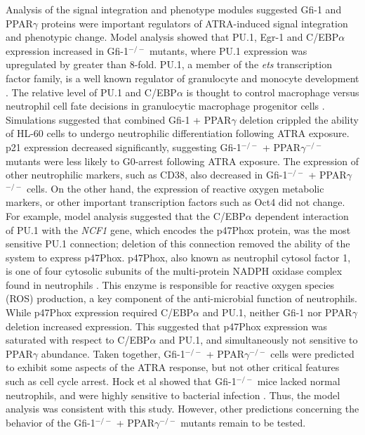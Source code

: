 \documentclass[12pt]{article}
\begin{document}
%
Analysis of the signal integration and phenotype modules suggested Gfi-1 and PPAR$\gamma$ proteins were important regulators of ATRA-induced signal integration and phenotypic change.
Model analysis showed that PU.1, Egr-1 and C/EBP$\alpha$ expression increased in Gfi-1$^{-/-}$ mutants, where PU.1 expression was upregulated by greater than 8-fold.
PU.1, a member of the \textit{ets} transcription factor family, is a well known regulator of granulocyte and monocyte development \cite{Friedman2007}.
The relative level of PU.1 and C/EBP$\alpha$ is thought to control macrophage versus neutrophil cell fate decisions in granulocytic macrophage progenitor cells \cite{Dahl2003}.
Simulations suggested that combined Gfi-1 + PPAR$\gamma$ deletion crippled the ability of HL-60 cells to undergo neutrophilic differentiation following ATRA exposure.
p21 expression decreased significantly, suggesting Gfi-1$^{-/-}$ + PPAR$\gamma$$^{-/-}$ mutants were less likely to G0-arrest following ATRA exposure.
The expression of other neutrophilic markers, such as CD38, also decreased in Gfi-1$^{-/-}$ + PPAR$\gamma$$^{-/-}$ cells.
On the other hand, the expression of reactive oxygen metabolic markers, or other important transcription factors such as Oct4 did not change.
For example, model analysis suggested that the C/EBP$\alpha$ dependent interaction of PU.1 with the \textit{NCF1} gene, which encodes the p47Phox protein, was the most sensitive PU.1 connection; deletion of this connection removed the ability of the system to express p47Phox.
p47Phox, also known as neutrophil cytosol factor 1, is one of four cytosolic subunits of the multi-protein NADPH oxidase complex found in neutrophils \cite{El-Benna:2009aa}. This enzyme is responsible for reactive oxygen species (ROS) production, a key component of the anti-microbial function of neutrophils.
While p47Phox expression required C/EBP$\alpha$ and PU.1, neither Gfi-1 nor PPAR$\gamma$ deletion increased expression.
This suggested that p47Phox expression was saturated with respect to C/EBP$\alpha$ and PU.1, and simultaneously not sensitive to PPAR$\gamma$ abundance.
Taken together, Gfi-1$^{-/-}$ + PPAR$\gamma$$^{-/-}$ cells were predicted to exhibit
some aspects of the ATRA response, but not other critical features such as cell cycle arrest.
Hock et al showed that Gfi-1$^{-/-}$ mice lacked normal neutrophils, and were highly sensitive to bacterial infection \cite{Hock:2003aa}.
Thus, the model analysis was consistent with this study.
However, other predictions concerning the behavior of the Gfi-1$^{-/-}$ + PPAR$\gamma$$^{-/-}$ mutants remain to be tested.
\end{document}
